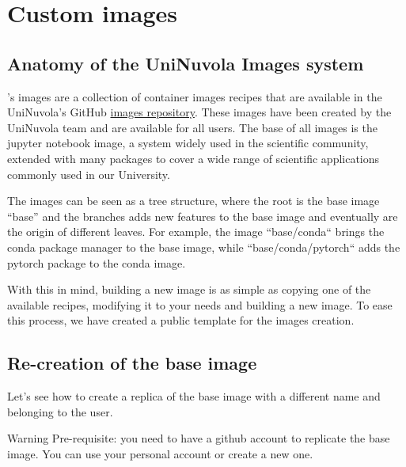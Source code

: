 \section{Custom images}
\subsection{Anatomy of the UniNuvola Images system}\label{image_anatomy}
\uninuvola's images are a collection of container images recipes that are
available in the UniNuvola's GitHub \href{https://github.com/UniNuvola/images}
{images repository}.
These images have been created by the UniNuvola team and are available for all users.
The base of all images is the jupyter notebook image, a system widely used in the
scientific community, extended with many packages to cover a wide range of
scientific applications commonly used in our University.

The images can be seen as a tree structure, where the root is the base image
``base'' and the branches adds new features to the base image and eventually
are the origin of different leaves.
For example, the image ``base/conda`` brings the conda package manager to the base
image, while ``base/conda/pytorch`` adds the pytorch package to the conda image.

With this in mind, building a new image is as simple as copying one of the
available recipes, modifying it to your needs and building a new image.
To ease this process, we have created a public template for the images creation.

\subsection{Re-creation of the base image}\label{image_recreation}
Let's see how to create a replica of the base image with a different name and belonging to the user.

\begin{bclogo}[logo=\bcinfo, couleurBarre=orange, noborder=true, couleur=white]{Warning}
  Pre-requisite: you need to have a github account to replicate the base
  image. You can use your personal account or create a new one.
\end{bclogo}

